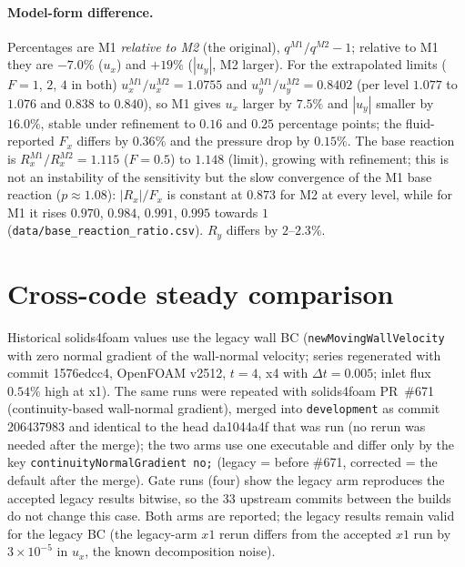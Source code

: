 \documentclass[sn-mathphys,Numbered]{sn-jnl}
\begin{document}
\paragraph{Model-form difference.}
Percentages are M1 \emph{relative to M2} (the original), $q^{M1}/q^{M2}-1$; relative to M1 they are $-7.0\%$ ($u_x$) and $+19\%$ ($|u_y|$, M2 larger).
For the extrapolated limits ($F=1$, $2$, $4$ in both) $u_x^{M1}/u_x^{M2}=1.0755$ and $u_y^{M1}/u_y^{M2}=0.8402$ (per level $1.077$ to $1.076$ and $0.838$ to $0.840$), so M1 gives $u_x$ larger by $7.5\%$ and $|u_y|$ smaller by $16.0\%$, stable under refinement to $0.16$ and $0.25$ percentage points; the fluid-reported $F_x$ differs by $0.36\%$ and the pressure drop by $0.15\%$.
The base reaction is $R_x^{M1}/R_x^{M2}=1.115$ ($F=0.5$) to $1.148$ (limit), growing with refinement; this is not an instability of the sensitivity but the slow convergence of the M1 base reaction ($p\approx1.08$): $|R_x|/F_x$ is constant at $0.873$ for M2 at every level, while for M1 it rises $0.970$, $0.984$, $0.991$, $0.995$ towards $1$ (\texttt{data/base\_reaction\_ratio.csv}). $R_y$ differs by $2$--$2.3\%$.

\section{Cross-code steady comparison}\label{sec:fx_crosscode}
Historical solids4foam values use the legacy wall BC (\texttt{newMovingWallVelocity} with zero normal gradient of the wall-normal velocity; series regenerated with commit 1576edcc4, OpenFOAM v2512, $t=4$, x4 with $\Delta t=0.005$; inlet flux $0.54\%$ high at x1).
The same runs were repeated with solids4foam PR~\#671 (continuity-based wall-normal gradient), merged into \texttt{development} as commit 206437983 and identical to the head da1044a4f that was run (no rerun was needed after the merge); the two arms use one executable and differ only by the key \texttt{continuityNormalGradient no;} (legacy = before \#671, corrected = the default after the merge).
Gate runs (four) show the legacy arm reproduces the accepted legacy results bitwise, so the 33 upstream commits between the builds do not change this case.
Both arms are reported; the legacy results remain valid for the legacy BC (the legacy-arm $x1$ rerun differs from the accepted $x1$ run by $3\times10^{-5}$ in $u_x$, the known decomposition noise).
\end{document}
